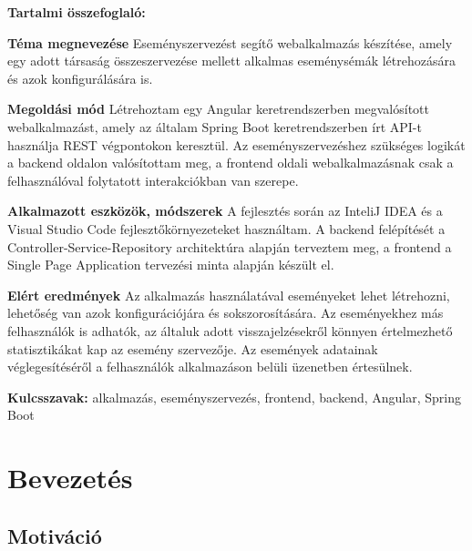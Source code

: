 \documentclass[a4paper,12pt]{report}
\theoremstyle{definition}
\theoremstyle{remark}
\begin{document}
{\Huge \bf Tartalmi összefoglaló:}


{\bf Téma megnevezése}
Eseményszervezést segítő webalkalmazás készítése, amely egy adott társaság összeszervezése mellett alkalmas eseménysémák létrehozására és azok konfigurálására is.

{\bf Megoldási mód}
Létrehoztam egy Angular keretrendszerben megvalósított webalkalmazást, amely az általam Spring Boot keretrendszerben írt API-t használja REST végpontokon keresztül. Az eseményszervezéshez szükséges logikát a backend oldalon valósítottam meg, a frontend oldali webalkalmazásnak csak a felhasználóval folytatott interakciókban van szerepe.

{\bf Alkalmazott eszközök, módszerek}
A fejlesztés során az InteliJ IDEA és a Visual Studio Code fejlesztőkörnyezeteket használtam. A backend felépítését a Controller-Service-Repository architektúra alapján terveztem meg, a frontend a Single Page Application tervezési minta alapján készült el.

{\bf Elért eredmények}
Az alkalmazás használatával eseményeket lehet létrehozni, lehetőség van azok konfigurációjára és sokszorosítására. Az eseményekhez más felhasználók is adhatók, az általuk adott visszajelzésekről könnyen értelmezhető statisztikákat kap az esemény szervezője. Az események adatainak véglegesítéséről a felhasználók alkalmazáson belüli üzenetben értesülnek.

{\bf Kulcsszavak:} alkalmazás, eseményszervezés, frontend, backend, Angular, Spring Boot


\newpage

\pagebreak

\tableofcontents
\pagebreak


\chapter{Bevezetés}

\section{Motiváció}
\end{document}
